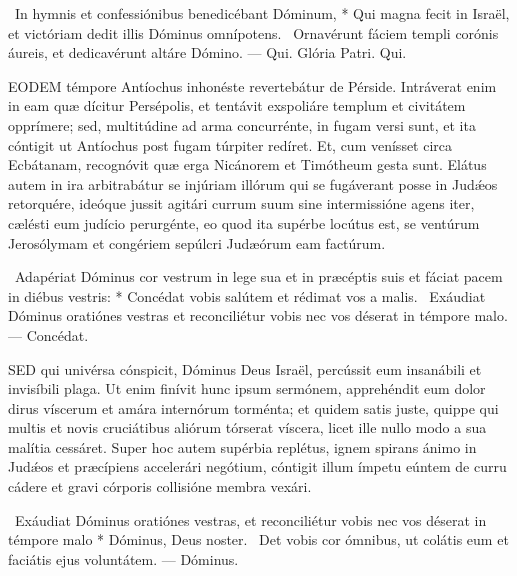 \R\ In hymnis et confessiónibus benedicébant Dóminum, * Qui magna fecit in Israël, et victóriam dedit illis Dóminus omnípotens. \V\ Ornavérunt fáciem templi corónis áureis, et dedicavérunt altáre Dómino. — Qui. Glória Patri. Qui.




\lettrine[lines=2]{E}{ODEM} témpore Antíochus inhonéste revertebátur de Pérside. Intráverat enim in eam quæ dícitur Persépolis, et tentávit exspoliáre templum et civitátem opprímere; sed, multitúdine ad arma concurrénte, in fugam versi sunt, et ita cóntigit ut Antíochus post fugam túrpiter redíret. Et, cum venísset circa Ecbátanam, recognóvit quæ erga Nicánorem et Timótheum gesta sunt. Elátus autem in ira arbitrabátur se injúriam illórum qui se fugáverant posse in Judǽos retorquére, ideóque jussit agitári currum suum sine intermissióne agens iter, cælésti eum judício perurgénte, eo quod ita supérbe locútus est, se ventúrum Jerosólymam et congériem sepúlcri Judæórum eam factúrum.

\R\ Adapériat Dóminus cor vestrum in lege sua et in præcéptis suis et fáciat pacem in diébus vestris: * Concédat vobis salútem et rédimat vos a malis. \V\ Exáudiat Dóminus oratiónes vestras et reconciliétur vobis nec vos déserat in témpore malo. — Concédat.


\lettrine[lines=2]{S}{ED} qui univérsa cónspicit, Dóminus Deus Israël, percússit eum insanábili et invisíbili plaga. Ut enim finívit hunc ipsum sermónem, apprehéndit eum dolor dirus víscerum et amára internórum torménta; et quidem satis juste, quippe qui multis et novis cruciátibus aliórum tórserat víscera, licet ille nullo modo a sua malítia cessáret. Super hoc autem supérbia replétus, ignem spirans ánimo in Judǽos et præcípiens accelerári negótium, cóntigit illum ímpetu eúntem de curru cádere et gravi córporis collisióne membra vexári.

\R\ Exáudiat Dóminus oratiónes vestras, et reconciliétur vobis nec vos déserat in témpore malo * Dóminus, Deus noster. \V\ Det vobis cor ómnibus, ut colátis eum et faciátis ejus voluntátem. — Dóminus.



